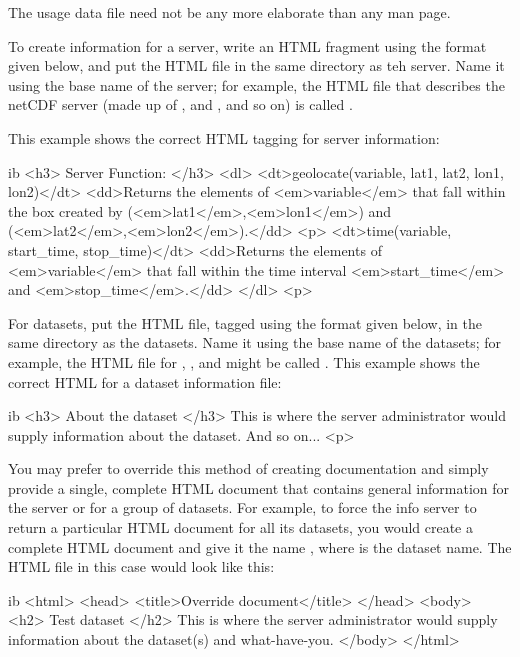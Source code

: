 The usage data file need not be any more elaborate than any man page.

To create information for a server, write an HTML fragment using the
format given below, and put the HTML file in the same directory as teh
server.  Name it using the base name of the server; for example, the
HTML file that describes the netCDF server (made up of ,
and ,  and so on) is called .

This example shows the correct HTML tagging for server information:

\begin{vcode}{ib}
<h3>
Server Function:
</h3>
<dl>
<dt>geolocate(variable, lat1, lat2, lon1, lon2)</dt>
<dd>Returns the elements of <em>variable</em> that fall 
within the box created by (<em>lat1</em>,<em>lon1</em>) 
and (<em>lat2</em>,<em>lon2</em>).</dd>
<p>
<dt>time(variable, start_time, stop_time)</dt>
<dd>Returns the elements of <em>variable</em> that fall 
within the time interval <em>start_time</em> and 
<em>stop_time</em>.</dd>
</dl>
<p>
\end{vcode}

For datasets, put the HTML file, tagged using the format given below,
in the same directory as the datasets.  Name it using the base name of
the datasets; for example, the HTML file for ,
, and  might be called .
This example shows the correct HTML for a dataset information file:

\begin{vcode}{ib}
<h3>
About the dataset
</h3>
This is where the server administrator would supply 
information about the dataset.  And so on...
<p>
\end{vcode}

You may prefer to override this method of creating documentation and
simply provide a single, complete HTML document that contains general
information for the server or for a group of datasets.  For example,
to force the info server to return a particular HTML document for all
its datasets, you would create a complete HTML document and give it
the name , where  is the dataset
name.  The HTML file in this case would look like this:

\begin{vcode}{ib}
<html>
<head>
<title>Override document</title>
</head>
<body>
<h2>
Test dataset
</h2>
This is where the server administrator would supply 
information about the dataset(s) and what-have-you.
</body>
</html>
\end{vcode}

